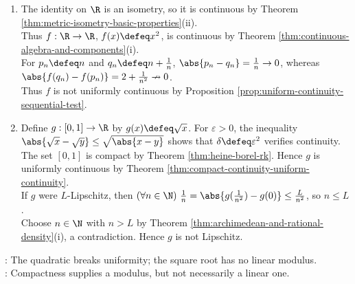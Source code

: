 \begin{counterexample} \label{cex:continuity-uniform-lipschitz-reversals} 
\begin{enumerate}[label=(\roman*)]
\setlength{\itemsep}{0pt}
\item The identity on $\R$ is an isometry, so it is continuous by Theorem \ref{thm:metric-isometry-basic-properties}(ii).\\
Thus $f:\R\to\R$, $f(x)\defeq x^2$, is continuous by Theorem \ref{thm:continuous-algebra-and-components}(i).\\
For $p_n\defeq n$ and $q_n\defeq n+\frac{1}{n}$, $\abs{p_n-q_n}=\frac{1}{n}\to0$, whereas $\abs{f(q_n)-f(p_n)}=2+\frac{1}{n^2}\nrightarrow0$.\\
Thus $f$ is not uniformly continuous by Proposition \ref{prop:uniform-continuity-sequential-test}.
\item Define $g:[0,1]\to\R$ by $g(x)\defeq\sqrt{x}$. For $\varepsilon>0$, the inequality $\abs{\sqrt{x}-\sqrt{y}}\leq\sqrt{\abs{x-y}}$ shows that $\delta\defeq\varepsilon^2$ verifies continuity.\\
The set $[0,1]$ is compact by Theorem \ref{thm:heine-borel-rk}. Hence $g$ is uniformly continuous by Theorem \ref{thm:compact-continuity-uniform-continuity}.\\
If $g$ were $L$-Lipschitz, then $(\forall n\in\N)\ \frac{1}{n}=\abs{g(\frac{1}{n^2})-g(0)}\leq\frac{L}{n^2}$, so $n\leq L$.\\
Choose $n\in\N$ with $n>L$ by Theorem \ref{thm:archimedean-and-rational-density}(i), a contradiction. Hence $g$ is not Lipschitz.
\end{enumerate}
: The quadratic breaks uniformity; the square root has no linear modulus.\\
: Compactness supplies a modulus, but not necessarily a linear one.
\end{counterexample}

